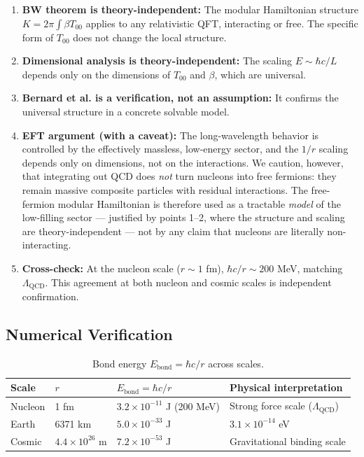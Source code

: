 \documentclass[11pt,letterpaper]{article}
\begin{document}
\begin{enumerate}
  \item \textbf{BW theorem is theory-independent:} The modular Hamiltonian structure
    $K = 2\pi \int \beta T_{00}$ applies to any relativistic QFT, interacting
    or free. The specific form of $T_{00}$ does not change the local structure.

  \item \textbf{Dimensional analysis is theory-independent:} The scaling
    $E \sim \hbar c/L$ depends only on the dimensions of $T_{00}$ and $\beta$,
    which are universal.

  \item \textbf{Bernard et al. is a verification, not an assumption:} It confirms
    the universal structure in a concrete solvable model.

  \item \textbf{EFT argument (with a caveat):} The long-wavelength behavior is
    controlled by the effectively massless, low-energy sector, and the $1/r$
    scaling depends only on dimensions, not on the interactions. We caution,
    however, that integrating out QCD does \emph{not} turn nucleons into free
    fermions: they remain massive composite particles with residual
    interactions. The free-fermion modular Hamiltonian is therefore used as a
    tractable \emph{model} of the low-filling sector --- justified by points
    1--2, where the structure and scaling are theory-independent --- not by any
    claim that nucleons are literally non-interacting.

  \item \textbf{Cross-check:} At the nucleon scale ($r \sim 1$ fm),
    $\hbar c/r \sim 200$ MeV, matching $\Lambda_{\mathrm{QCD}}$. This agreement at
    both nucleon and cosmic scales is independent confirmation.
\end{enumerate}

\subsection{Numerical Verification}

\begin{table}[H]
  \centering
  \caption[Bond energy across scales]{Bond energy $E_{\mathrm{bond}} = \hbar c/r$ across scales.}
  \label{tab:bond_energy}
  \begin{tabular}{llll}
    \toprule
    Scale & $r$ & $E_{\mathrm{bond}} = \hbar c/r$ & Physical interpretation \\
    \midrule
    Nucleon & 1 fm & $3.2 \times 10^{-11}$ J (200 MeV) & Strong force scale ($\Lambda_{\mathrm{QCD}}$) \\
    Earth & 6371 km & $5.0 \times 10^{-33}$ J & $3.1 \times 10^{-14}$ eV \\
    Cosmic & $4.4 \times 10^{26}$ m & $7.2 \times 10^{-53}$ J & Gravitational binding scale \\
    \bottomrule
  \end{tabular}
\end{table}
\end{document}
